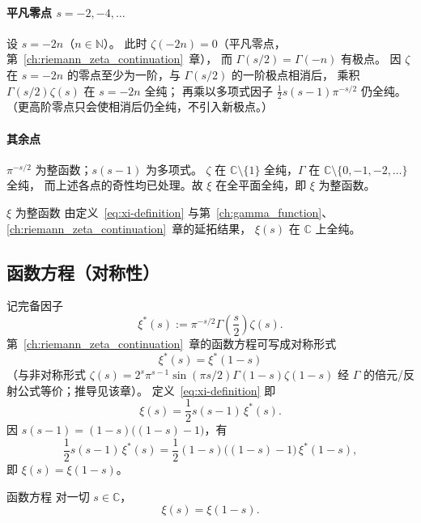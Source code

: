 \paragraph{平凡零点 $s=-2,-4,\ldots$}
设 $s=-2n$（$n\in\mathbb{N}$）。
此时 $\zeta(-2n)=0$（平凡零点，第~\ref{ch:riemann_zeta_continuation}~章），
而 $\Gamma(s/2)=\Gamma(-n)$ 有极点。
因 $\zeta$ 在 $s=-2n$ 的零点至少为一阶，与 $\Gamma(s/2)$ 的一阶极点相消后，
乘积 $\Gamma(s/2)\zeta(s)$ 在 $s=-2n$ 全纯；
再乘以多项式因子 $\frac12 s(s-1)\pi^{-s/2}$ 仍全纯。
（更高阶零点只会使相消后仍全纯，不引入新极点。）

\paragraph{其余点}
$\pi^{-s/2}$ 为整函数；$s(s-1)$ 为多项式。
$\zeta$ 在 $\mathbb{C}\setminus\{1\}$ 全纯，$\Gamma$ 在 $\mathbb{C}\setminus\{0,-1,-2,\ldots\}$ 全纯，
而上述各点的奇性均已处理。故 $\xi$ 在全平面全纯，即 $\xi$ 为整函数。

\begin{proposition}{\texorpdfstring{$\xi$}{xi} 为整函数}{}
\label{prop:xi-entire}
由定义~\eqref{eq:xi-definition} 与第~\ref{ch:gamma_function}、\ref{ch:riemann_zeta_continuation}~章的延拓结果，
$\xi(s)$ 在 $\mathbb{C}$ 上全纯。
\end{proposition}

\subsection{函数方程（对称性）}
\label{sec:xi-symmetry-sketch}

记完备因子
\[
  \xi^*(s):=\pi^{-s/2}\Gamma\!\left(\frac s2\right)\zeta(s).
\]
第~\ref{ch:riemann_zeta_continuation}~章的函数方程可写成对称形式
\[
  \xi^*(s)=\xi^*(1-s)
\]
（与非对称形式
$\zeta(s)=2^s\pi^{s-1}\sin(\pi s/2)\Gamma(1-s)\zeta(1-s)$
经 $\Gamma$ 的倍元/反射公式等价；推导见该章）。
定义~\eqref{eq:xi-definition} 即
\[
  \xi(s)=\frac12 s(s-1)\,\xi^*(s).
\]
因 $s(s-1)=(1-s)\bigl((1-s)-1\bigr)$，有
\[
  \frac12 s(s-1)\,\xi^*(s)
  =\frac12 (1-s)\bigl((1-s)-1\bigr)\,\xi^*(1-s),
\]
即 $\xi(s)=\xi(1-s)$。

\begin{proposition}{函数方程}{}
\label{prop:xi-fe}
对一切 $s\in\mathbb{C}$，
\begin{equation}
        \xi(s) = \xi(1-s).
        \label{eq:xi-functional-equation}
\end{equation}
\end{proposition}

